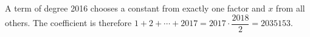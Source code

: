 A term of degree 2016 chooses a constant from exactly one factor and $x$ from all others. The coefficient is therefore $1+2+\cdots+2017=2017\cdot\dfrac{2018}{2}=\boxed{2035153}$.
